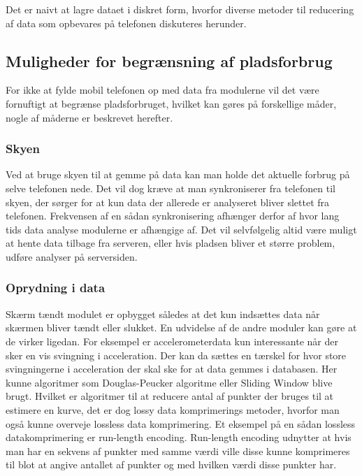 Det er naivt at lagre dataet i diskret form, hvorfor diverse metoder til reducering af data som opbevares på telefonen diskuteres herunder.

\subsection{Muligheder for begrænsning af pladsforbrug}
For ikke at fylde mobil telefonen op med data fra modulerne vil det være fornuftigt at begrænse pladsforbruget, hvilket kan gøres på forskellige måder, nogle af måderne er beskrevet herefter.

\subsubsection{Skyen}
Ved at bruge skyen til at gemme på data kan man holde det aktuelle forbrug på selve telefonen nede.
Det vil dog kræve at man synkroniserer fra telefonen til skyen, der sørger for at kun data der allerede er analyseret bliver slettet fra telefonen. 
Frekvensen af en sådan synkronisering afhænger derfor af hvor lang tids data analyse modulerne er afhængige af.
Det vil selvfølgelig altid være muligt at hente data tilbage fra serveren, eller hvis pladsen bliver et større problem, udføre analyser på serversiden.

\subsubsection{Oprydning i data}\label{sec:opryd}
Skærm tændt modulet er opbygget således at det kun indsættes data når skærmen bliver tændt eller slukket.
En udvidelse af de andre moduler kan gøre at de virker ligedan. 
For eksempel er accelerometerdata kun interessante når der sker en vis svingning i acceleration.
Der kan da sættes en tærskel for hvor store svingningerne i acceleration der skal ske for at data gemmes i databasen.
Her kunne algoritmer som Douglas-Peucker algoritme eller Sliding Window blive brugt.
Hvilket er algoritmer til at reducere antal af punkter der bruges til at estimere en kurve, det er dog lossy data komprimerings metoder, hvorfor man også kunne overveje lossless data komprimering.
Et eksempel på en sådan lossless datakomprimering er run-length encoding.
Run-length encoding udnytter at hvis man har en sekvens af punkter med samme værdi ville disse kunne komprimeres til blot at angive antallet af punkter og med hvilken værdi disse punkter har.

